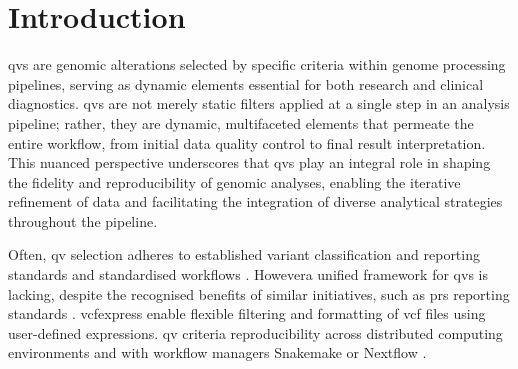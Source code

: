 \clearpage

\section{Introduction}
\label{sec:intro}
\DIFdelbegin %

\DIFdelend \ac{qv}s are genomic alterations selected by specific criteria within genome processing pipelines, serving as dynamic elements essential for both research and clinical diagnostics. 
\ac{qv}s are not merely static filters applied at a single step in an analysis pipeline; rather, they are dynamic, multifaceted elements that permeate the entire workflow, from initial data quality control to final result interpretation. This nuanced perspective underscores that \ac{qv}s play an integral role in shaping the fidelity and reproducibility of genomic analyses, enabling the iterative refinement of data and facilitating the integration of diverse analytical strategies throughout the pipeline.

Often, \ac{qv} selection adheres to established variant classification and reporting standards \cite{richards2015standards, li2017standards, li2017intervar, riggs2020technical, tavtigian2020fitting} and standardised workflows \cite{pedersen2021effective, anderson2010data, uffelmann2021genome}. 
However\DIFaddbegin \DIFadd{, }\DIFaddend a unified framework for \ac{qv}s is lacking, despite the recognised benefits of similar initiatives, such as \ac{prs} reporting standards \cite{wand2021improving, lambert2021polygenic}.
\DIFdelbegin {}\DIFdelend \DIFaddbegin {}\DIFaddend vcfexpress \cite{pedersen_vcfexpress_2025} enable flexible \DIFdelbegin {}\DIFdelend filtering and formatting of \DIFdelbegin {}\DIFdelend \DIFaddbegin \ac{vcf} \DIFaddend files using user-defined expressions. \DIFdelbegin {}\DIFdelend \DIFaddbegin {}\DIFaddend \ac{qv} criteria \DIFdelbegin {}\DIFdelend \DIFaddbegin {}\DIFaddend reproducibility across distributed computing environments \cite{bal_programming_1989} and \DIFdelbegin {}\DIFdelend \DIFaddbegin {}\DIFaddend with workflow managers \DIFdelbegin {}\DIFdelend \DIFaddbegin {}\DIFaddend Snakemake \cite{molder_sustainable_2021} or Nextflow \cite{di_tommaso_nextflow_2017}\DIFdelbegin {}\DIFdelend .

